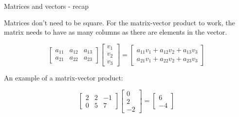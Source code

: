 \documentclass{beamer}
\begin{document}
\begin{frame}{Matrices and vectors - recap}
	\begin{flushleft}
		
		Matrices don't need to be square. For the matrix-vector product to work, the matrix needs to have as many columns as there are elements in the vector. 
		
		\begin{equation}
			\begin{bmatrix}
				a_{11} & a_{12} & a_{13} \\
				a_{21} & a_{22} & a_{23} 
			\end{bmatrix}
			\begin{bmatrix}
				v_{1}  \\
				v_{2}  \\
				v_{3}
			\end{bmatrix} =
			\begin{bmatrix}
				a_{11} v_{1} + a_{12} v_{2} + a_{13}v_{3} \\
				a_{21} v_{1} + a_{22} v_{2} + a_{23}v_{3} 
			\end{bmatrix}
		\end{equation}
		
		\bigskip
		
		An example of a matrix-vector product:
		
		\begin{equation}
			\begin{bmatrix}
				2 & 2 & -1 \\
				0 & 5 & 7 
			\end{bmatrix}
			\begin{bmatrix}
				0  \\
				2  \\
				-2
			\end{bmatrix} =
			\begin{bmatrix}
				6 \\
				-4
			\end{bmatrix}
		\end{equation}
		
	\end{flushleft}
\end{frame}
\end{document}
